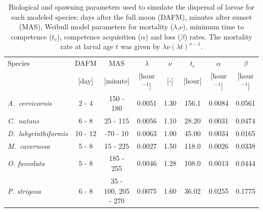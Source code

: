 \documentclass[preprint,12pt,authoryear]{elsarticle}
\begin{document}
	\begin{table}
		\begin{adjustwidth}{-1in}{-1in}
			\centering
			\footnotesize
			\begin{tabular}{lccccccc}
				\hline
				Species & DAFM  & MAS      &  $\lambda$     & $\nu$ & $t_c$  & $\alpha$      & $\beta$ \\
				& [day] & [minute] &  [hour$^{-1}$] & [-]   & [hour] & [hour$^{-1}$] & [hour$^{-1}$] \\
				\hline
				\textit{A.~cervicornis} & 2 - 4 & 150 - 180 & 0.0051 & 1.30 & 156.1 & 0.0084 & 0.0561 \\
				\textit{C.~natans}      & 6 - 8 & 25 - 115  &  0.0056 & 1.10 & 28.20 & 0.0031 & 0.0474 \\
				\textit{D.~labyrinthiformis} & 10 - 12 & -70 - 10 & 0.0063 & 1.00 &  45.00 & 0.0034 & 0.0165 \\
				\textit{M.~cavernosa}   & 5 - 8 & 15 - 225 & 0.0027 & 1.50 & 118.0 & 0.0026 & 0.0338 \\
				\textit{O. faveolata}   & 5 - 8 & 185 - 255 &  0.0046 & 1.28 & 108.0 & 0.0013 & 0.0444 \\
				\textit{P. strigosa}    & 6 - 8 &  35 - 100, 205 - 270 & 0.0075 & 1.60 & 36.02 & 0.0255 & 0.1775 \\
				\hline
			\end{tabular}
		\end{adjustwidth}
		\caption{Biological and spawning parameters used to simulate the dispersal of larvae for each modeled species: days after the full moon (DAFM), minutes after sunset (MAS), Weibull model parameters for mortality ($\lambda$,$\nu$), minimum time to competence ($t_c$), competence acquisition ($\alpha$) and loss ($\beta$) rates. The mortality rate at larval age $t$ was given by $\lambda\nu(\lambda t)^{\nu-1}$.}\label{tab:species}
	\end{table}
	
\end{document}
